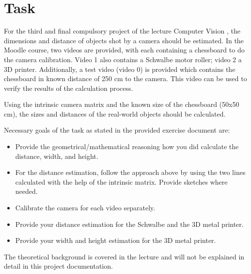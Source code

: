 \chapter{Task}
For the third and final compulsory project of the lecture Computer Vision \cite{cv_lecture_ex}, the dimensions and distance of objects shot by a camera should be estimated. In the Moodle course, two videos are provided, with each containing a chessboard to do the camera calibration. Video 1 also contains a Schwalbe motor roller; video 2 a 3D printer. Additionally, a test video (video 0) is provided which contains the chessboard in known distance of 250 cm to the camera. This video can be used to verify the results of the calculation process.

Using the intrinsic camera matrix and the known size of the chessboard (50x50 cm), the sizes and distances of the real-world objects should be calculated.

Necessary goals of the task as stated in the provided exercise document are: \cite{cv_lecture_ex}
\begin{itemize}
    \item Provide the geometrical/mathematical reasoning how you did calculate the distance, width, and height.
    \item For the distance estimation, follow the approach above by using the two 
    lines calculated with the help of the intrinsic matrix. Provide sketches where needed.
    \item Calibrate the camera for each video separately.
    \item Provide your distance estimation for the Schwalbe and the 3D metal printer.
    \item Provide your width and height estimation for the 3D metal printer.
\end{itemize}

The theoretical background is covered in the lecture and will not be explained in detail in this project documentation.
